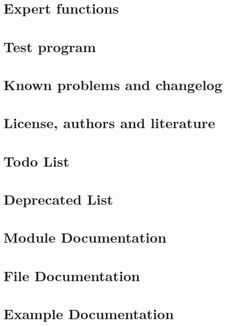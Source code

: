 \let\mypdfximage\pdfximage\def\pdfximage{\immediate\mypdfximage}\documentclass[twoside]{book}
\newcommand{\+}{\discretionary{\mbox{\scriptsize$\hookleftarrow$}}{}{}}
\newcommand{\clearemptydoublepage}{%
  \newpage{\pagestyle{empty}\cleardoublepage}%
}
\begin{document}
\chapter{Expert functions}
\label{md__6_expert}

\chapter{Test program}
\label{md__7_test_driver}

\chapter{Known problems and changelog}
\label{md_docs_generated__0_changelog}

\chapter{License, authors and literature}
\label{md_docs_generated__1_authors}

\chapter{Todo List}
\label{todo}

\chapter{Deprecated List}
\label{deprecated}

\chapter{Module Documentation}












\chapter{File Documentation}













\chapter{Example Documentation}







\backmatter
\newpage
{}
\clearemptydoublepage
{}
\printindex
\end{document}
